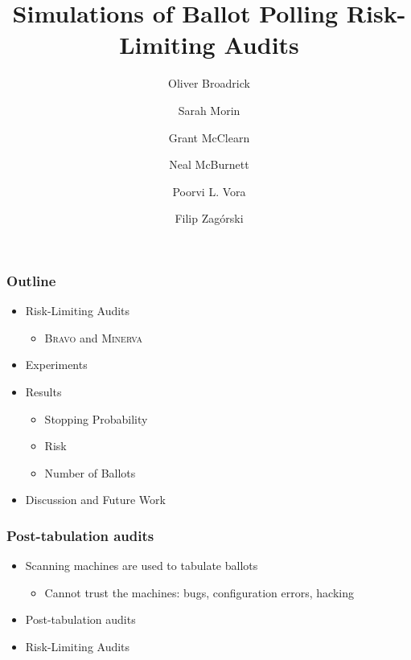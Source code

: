\documentclass{beamer}
\newcommand{\Minerva}{\textsc{Minerva}\xspace}
\newcommand{\BRAVO}{\textsc{Bravo}\xspace}
\begin{document}
\lstset{language=Python}
%
\title{Simulations of Ballot Polling Risk-Limiting Audits}
%
%
\author{Oliver Broadrick \and
Sarah Morin \and
Grant McClearn\\ \and Neal McBurnett \and Poorvi L. Vora \and
Filip Zag{\'o}rski}
%
%
%

\frame{\titlepage}
%

\begin{frame}
\frametitle{Outline}

\begin{itemize}
\item Risk-Limiting Audits
\begin{itemize}
\item \BRAVO and \Minerva
\end{itemize}
\item Experiments
\item Results
\begin{itemize}
\item Stopping Probability
\item Risk
\item Number of Ballots
\end{itemize}
\item Discussion and Future Work
\end{itemize}

\end{frame}


\begin{frame}
\frametitle{Post-tabulation audits}

\begin{itemize}
\item Scanning machines are used to tabulate ballots
\begin{itemize}
\item Cannot trust the machines: bugs, configuration errors, hacking
\end{itemize}
\item Post-tabulation audits
\item Risk-Limiting Audits
\end{itemize}
\end{frame}
\end{document}
